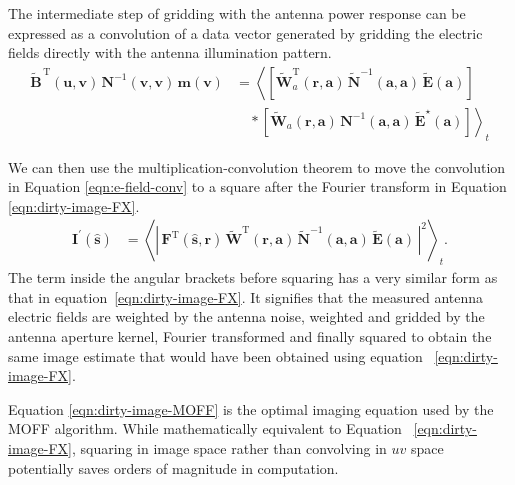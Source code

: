 \documentclass[a4paper,fleqn,usenatbib]{mnras}
\begin{document}
The intermediate step of gridding with the antenna power response can be 
expressed as a convolution of a data vector generated by gridding the electric 
fields directly with the antenna illumination pattern.
\begin{align}
\widetilde{\mathbf{B}}^{\,\textrm{T}}(\mathbf{u},\mathbf{v})\,\mathbf{N}^{-1}(\mathbf{v} ,\mathbf{v})\,\mathbf{m}(\mathbf{v}) &= \left\langle \left[\widetilde{\mathbf{W}}^\textrm{T}_a(\mathbf{r},\mathbf{a})\, \widetilde{\mathbf{N}}^{-1}\!(\mathbf{a},\mathbf{a})\, \widetilde{\mathbf{E}}(\mathbf{a})\right]\right. \nonumber\\ 
&\quad\ast\left.\left[\widetilde{\mathbf{W}}_a(\mathbf{r},\mathbf{a})\, \mathbf{N}^{-1}\!(\mathbf{a},\mathbf{a})\, \widetilde{\mathbf{E}}^\star(\mathbf{a})\right]\right\rangle_t\label{eqn:e-field-conv}
\end{align}

We can then use the multiplication-convolution theorem to move the convolution in 
Equation \ref{eqn:e-field-conv} to a square after the Fourier transform in 
Equation 
\ref{eqn:dirty-image-FX}.
\begin{align}
  \mathbf{I}^\prime(\hat{\mathbf{s}}) &= \left\langle \left|\,\mathbf{F}^\textrm{T}(\hat{\mathbf{s}},\mathbf{r})\,\widetilde{\mathbf{W}}^\textrm{T}(\mathbf{r},\mathbf{a})\,\widetilde{\mathbf{N}}^{-1}(\mathbf{a},\mathbf{a})\,\widetilde{\mathbf{E}}(\mathbf{a})\,\right|^2\right\rangle_t. \label{eqn:dirty-image-MOFF}
\end{align}
The term inside the angular brackets before squaring has a very similar form as
that in equation~\ref{eqn:dirty-image-FX}. It signifies that the measured antenna
electric fields are weighted by the antenna noise, weighted and gridded by the
antenna aperture kernel, Fourier transformed and finally squared to obtain the
same image estimate that would have been obtained using equation~
\ref{eqn:dirty-image-FX}. 

Equation \ref{eqn:dirty-image-MOFF} is the optimal imaging equation used by the 
MOFF algorithm. While mathematically equivalent to Equation~
\ref{eqn:dirty-image-FX}, squaring in image space rather than convolving in $uv$ 
space potentially saves orders of magnitude in computation.
\end{document}
